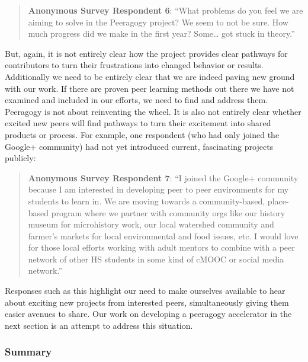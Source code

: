 \begin{quote}
\textbf{Anonymous Survey Respondent 6}: ``What problems do you feel we
are aiming to solve in the Peeragogy project? We seem to not be sure.
How much progress did we make in the first year? Some\ldots{} got stuck
in theory.''
\end{quote}
But, again, it is not entirely clear how the project provides clear
pathways for contributors to turn their frustrations into changed
behavior or results. Additionally we need to be entirely clear that we
are indeed paving new ground with our work. If there are proven peer
learning methods out there we have not examined and included in our
efforts, we need to find and address them. Peeragogy is not about
reinventing the wheel. It is also not entirely clear whether excited new
peers will find pathways to turn their excitement into shared products
or process. For example, one respondent (who had only joined the Google+
community) had not yet introduced current, fascinating projects
publicly:

\begin{quote}
\textbf{Anonymous Survey Respondent 7}: ``I joined the Google+ community
because I am interested in developing peer to peer environments for my
students to learn in. We are moving towards a community-based,
place-based program where we partner with community orgs like our
history museum for microhistory work, our local watershed community and
farmer's markets for local environmental and food issues, etc. I would
love for those local efforts working with adult mentors to combine with
a peer network of other HS students in some kind of cMOOC or social
media network.''
\end{quote}
Responses such as this highlight our need to make ourselves available to
hear about exciting new projects from interested peers, simultaneously
giving them easier avenues to share. Our work on developing a peeragogy
accelerator in the next section is an attempt to address this situation.

\subsubsection{Summary}

